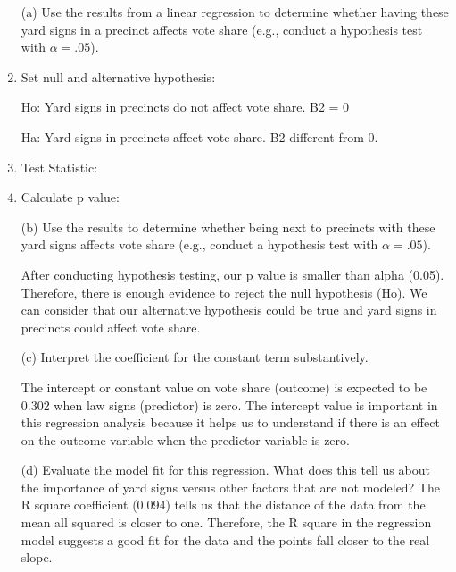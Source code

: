 \documentclass[12pt,letterpaper]{article}
\begin{document}
	\vspace{.5cm}
	\begin{enumerate}
		\item [(a)] Use the results from a linear regression to determine whether having these yard signs in a precinct affects vote share (e.g., conduct a hypothesis test with $\alpha = .05$).
		\vspace{1cm}
		
		\item  Set null and alternative hypothesis:
		
	\noindent Ho: Yard signs in precincts do not affect vote share. B2 = 0
	
	\noindent Ha: Yard signs in precincts affect vote share. B2 different from 0.  
				\vspace{1cm}
\newpage	
		\item  Test Statistic:
		
		  
				\vspace{1cm}
		\item  Calculate p value:
		
		  
		
		\vspace{3cm}
		\item [(b)]  Use the results to determine whether being
		next to precincts with these yard signs affects vote
		share (e.g., conduct a hypothesis test with $\alpha = .05$).
		
		\vspace{1cm}		
		\noindent  After conducting hypothesis testing, our p value is smaller than alpha (0.05). Therefore, there is enough evidence to reject the null hypothesis (Ho). We can consider that our alternative hypothesis could be true and yard signs in precincts could affect vote share.
		
		\vspace{2cm}
		\item [(c)] Interpret the coefficient for the constant term substantively.
		\vspace{1cm}
		
		\noindent The intercept or constant value on vote share (outcome) is expected to be 0.302 when law signs (predictor) is zero. The intercept value is important in this regression analysis because it helps us to understand if there is an effect on the outcome variable when the predictor variable is zero. 
		
		\vspace{2cm}
				
		\item [(d)] Evaluate the model fit for this regression.  What does this	tell us about the importance of yard signs versus other factors that are not modeled?
		\vspace{1cm}
		\noindent The R square coefficient (0.094) tells us that the distance of the data from the mean all squared is closer to one. Therefore, the R square in the regression model suggests a good fit for the data and the points fall closer to the real slope. 
		
	\end{enumerate}  
	
\end{document}
